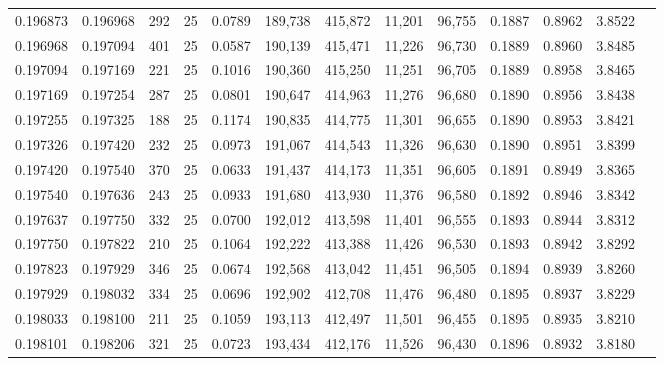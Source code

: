 \begin{tabular}{rrrrrrrrrrrrr}
0.196873 & 0.196968 &   292 &  25 &                                     0.0789 & 189,738 & 415,872 &  11,201 &  96,755 & 0.1887 & 0.8962 & 3.8522 \\
0.196968 & 0.197094 &   401 &  25 &                                     0.0587 & 190,139 & 415,471 &  11,226 &  96,730 & 0.1889 & 0.8960 & 3.8485 \\
0.197094 & 0.197169 &   221 &  25 &                                     0.1016 & 190,360 & 415,250 &  11,251 &  96,705 & 0.1889 & 0.8958 & 3.8465 \\
0.197169 & 0.197254 &   287 &  25 &                                     0.0801 & 190,647 & 414,963 &  11,276 &  96,680 & 0.1890 & 0.8956 & 3.8438 \\
0.197255 & 0.197325 &   188 &  25 &                                     0.1174 & 190,835 & 414,775 &  11,301 &  96,655 & 0.1890 & 0.8953 & 3.8421 \\
0.197326 & 0.197420 &   232 &  25 &                                     0.0973 & 191,067 & 414,543 &  11,326 &  96,630 & 0.1890 & 0.8951 & 3.8399 \\
0.197420 & 0.197540 &   370 &  25 &                                     0.0633 & 191,437 & 414,173 &  11,351 &  96,605 & 0.1891 & 0.8949 & 3.8365 \\
0.197540 & 0.197636 &   243 &  25 &                                     0.0933 & 191,680 & 413,930 &  11,376 &  96,580 & 0.1892 & 0.8946 & 3.8342 \\
0.197637 & 0.197750 &   332 &  25 &                                     0.0700 & 192,012 & 413,598 &  11,401 &  96,555 & 0.1893 & 0.8944 & 3.8312 \\
0.197750 & 0.197822 &   210 &  25 &                                     0.1064 & 192,222 & 413,388 &  11,426 &  96,530 & 0.1893 & 0.8942 & 3.8292 \\
0.197823 & 0.197929 &   346 &  25 &                                     0.0674 & 192,568 & 413,042 &  11,451 &  96,505 & 0.1894 & 0.8939 & 3.8260 \\
0.197929 & 0.198032 &   334 &  25 &                                     0.0696 & 192,902 & 412,708 &  11,476 &  96,480 & 0.1895 & 0.8937 & 3.8229 \\
0.198033 & 0.198100 &   211 &  25 &                                     0.1059 & 193,113 & 412,497 &  11,501 &  96,455 & 0.1895 & 0.8935 & 3.8210 \\
0.198101 & 0.198206 &   321 &  25 &                                     0.0723 & 193,434 & 412,176 &  11,526 &  96,430 & 0.1896 & 0.8932 & 3.8180 \\

\end{tabular}
